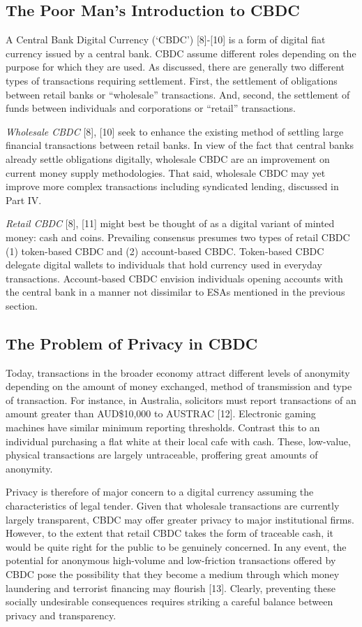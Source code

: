 \subsection{The Poor Man’s Introduction to CBDC}

A Central Bank Digital Currency (`CBDC') [8]-[10] is a form of digital fiat currency issued by a central bank. CBDC assume different roles depending on the purpose for which they are used. As discussed, there are generally two different types of transactions requiring settlement. First, the settlement of obligations between retail banks or ``wholesale'' transactions. And, second, the settlement of funds between individuals and corporations or ``retail'' transactions.

\textit{Wholesale CBDC} [8], [10] seek to enhance the existing method of settling large financial transactions between retail banks. In view of the fact that central banks already settle obligations digitally, wholesale CBDC are an improvement on current money supply methodologies. That said, wholesale CBDC may yet improve more complex transactions including syndicated lending, discussed in Part IV.

\textit{Retail CBDC} [8], [11] might best be thought of as a digital variant of minted money: cash and coins. Prevailing consensus presumes two types of retail CBDC (1) token-based CBDC and (2) account-based CBDC. Token-based CBDC delegate digital wallets to individuals that hold currency used in everyday transactions. Account-based CBDC envision individuals opening accounts with the central bank in a manner not dissimilar to ESAs mentioned in the previous section.

\subsection{The Problem of Privacy in CBDC}

Today, transactions in the broader economy attract different levels of anonymity depending on the amount of money exchanged, method of transmission and type of transaction. For instance, in Australia, solicitors must report transactions of an amount greater than AUD\$10,000 to AUSTRAC [12]. Electronic gaming machines have similar minimum reporting thresholds. Contrast this to an individual purchasing a flat white at their local cafe with cash. These, low-value, physical transactions are largely untraceable, proffering great amounts of anonymity.

Privacy is therefore of major concern to a digital currency assuming the characteristics of legal tender. Given that wholesale transactions are currently largely transparent, CBDC may offer greater privacy to major institutional firms. However, to the extent that retail CBDC takes the form of traceable cash, it would be quite right for the public to be genuinely concerned. In any event, the potential for anonymous high-volume and low-friction transactions offered by CBDC pose the possibility that they become a medium through which money laundering and terrorist financing may flourish [13]. Clearly, preventing these socially undesirable consequences requires striking a careful balance between privacy and transparency. 

